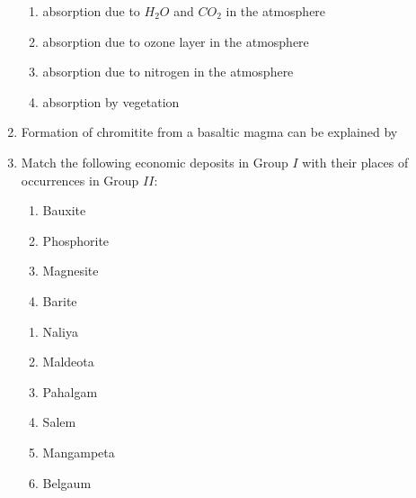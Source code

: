 \documentclass[12pt,fleqn]{article}
\theoremstyle{remark}
\begin{document}
\begin{enumerate}[label=Q.\arabic*.]
        \begin{enumerate}
                \item absorption due to $H_2O$ and $CO_2$ in the atmosphere
                \item absorption due to ozone layer in the atmosphere
                \item absorption due to nitrogen in the atmosphere
                \item absorption by vegetation               
            \end{enumerate}
    \item Formation of chromitite from a basaltic magma can be explained by \hfill{} 
        \begin {enumerate}
            \end{enumerate}
    \item Match the following economic deposits in Group $I$ with their places of occurrences in Group $II$: \hfill{} \\
\newpage
\begin{multicols}{2}
            \begin{enumerate}[label=(\Alph*),start=16]
                \item Bauxite
                \item Phosphorite
                \item Magnesite
                \item Barite
            \end{enumerate}
            
            \columnbreak
            
            \begin{enumerate}[label=\arabic*.]
                \item Naliya
                \item Maldeota
                \item Pahalgam
                \item Salem
                \item Mangampeta
                \item Belgaum
            \end{enumerate}
            


\end{multicols}
\end{enumerate}
\end{document}
